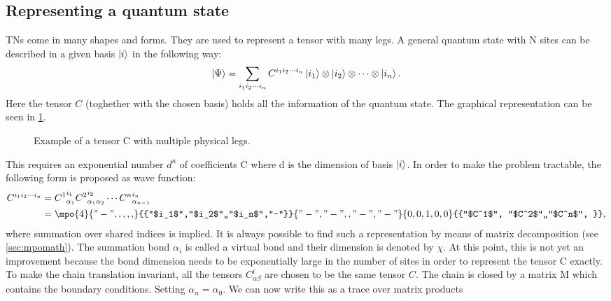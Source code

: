 \subsection{Representing a quantum state}

\Glspl{TN} come in many shapes and forms. They are used to represent a tensor with many legs. A general quantum state with N sites can be described in a given basis $\ket{i}$ in the following way:
\begin{equation}
  \ket{\Psi} = \sum_{i_1 i_2 \cdots i_n } C^{i_1 i_2 \cdots i_n} \ket{i_1} \otimes \ket{i_2} \otimes \cdots \otimes \ket{i_n} .
\end{equation}
Here the tensor $C$ (toghether with the chosen basis) holds all the information of the quantum state. The graphical representation can be seen in \cref{fig:tens:intro:C}.
\begin{figure}[!htbp]
  \centering


  \caption{Example of a tensor C with multiple physical legs.}
  \label{fig:tens:intro:C}
\end{figure}
\noindent
This requires an exponential number $d^n$ of coefficients C where d is the dimension of basis $\ket{i}$. In order to make the problem tractable, the following form is proposed as wave function:
\begin{equation}
  \begin{split}
    C^{i_1 i_2 \cdots i_n} &= {C^{1}}_{\alpha_1}^{ i_1} {C^{2}}_{\alpha_1 \alpha_2}^{i_2} \cdots  {C^{n}}_{\alpha_{n-1} }^{i_n} \\
    & =\mpo{4}{{"-",,,,,}}{{"$i_1$","$i_2$",,"$i_n$","-"}}{{"-","-",,"-","-"}}{{0,0,1,0,0}}{{"$C^1$", "$C^2$",,"$C^n$", }} ,
  \end{split}
\end{equation}
where summation over shared indices is implied. It is always possible to find such a representation by means of matrix decomposition (see \cref{sec:mpomath}). The summation bond $\alpha_i$ is called a virtual bond and their dimension is denoted by $\chi$. At this point, this is not yet an improvement because the bond dimension needs to be exponentially large in the number of sites in order to represent the tensor C exactly. To make the chain translation invariant, all the tensors $C^i_{\alpha \beta }$ are chosen to be the same tensor $C$. The chain is closed by a matrix M which contains the boundary conditions. Setting $\alpha_n = \alpha_0$. We can now write this as a trace over matrix products
